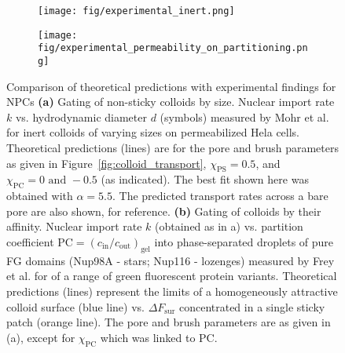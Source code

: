 \documentclass[12pt, a4paper]{article}
\begin{document}
\begin{figure}
    \centering
    \begin{subfigure}[b]{0.45\textwidth}
        \texttt{[image: fig/experimental\_inert.png]}
    \end{subfigure}
    \begin{subfigure}[b]{0.45\textwidth}
        \texttt{[image: fig/experimental\_permeability\_on\_partitioning.png]}
    \end{subfigure}
    \caption{
    Comparison of theoretical predictions with experimental findings for NPCs
    \textbf{(a)} 
    Gating of non-sticky colloids by size.
    Nuclear import rate $k$ vs. hydrodynamic diameter $d$ (symbols) measured by Mohr et al. for inert colloids of varying sizes on permeabilized Hela cells.
    Theoretical predictions (lines) are for the pore and brush parameters as given in Figure~\ref{fig:colloid_transport}, $\chi_{\text{PS}} = 0.5$, and $\chi_{\text{PC}} = 0 \text{ and } -0.5$ (as indicated).
    The best fit shown here was obtained with $\alpha = 5.5$.
    The predicted transport rates across a bare pore are also shown, for reference.
    \textbf{(b)} 
    Gating of colloids by their affinity.
    Nuclear import rate $k$ (obtained as in a) vs. partition coefficient $\text{PC}=\left(c_{\text{in}}/c_{\text{out}}\right)_{\text{gel}}$ into phase-separated droplets of pure FG domains (Nup98A - stars; Nup116 - lozenges) measured by Frey et al. for of a range of green fluorescent protein variants.
    Theoretical predictions (lines) represent the limits of a homogeneously attractive colloid surface (blue line) vs. $\Delta F_\text{sur}$ concentrated in a single sticky patch (orange line).
    The pore and brush parameters are as given in (a), except for $\chi_\text{PC}$ which was linked to $\text{PC}$.
    }
    \label{fig:NPC_comparison}
\end{figure}
\end{document}

